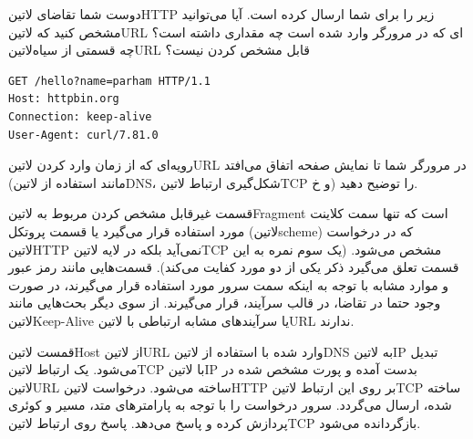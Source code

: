 
دوست شما تقاضای ‌لاتین{HTTP} زیر را برای شما ارسال کرده است.
آیا می‌توانید مشخص کنید که ‌لاتین{URL} ای که در مرورگر وارد شده است چه مقداری داشته است؟
چه قسمتی از ‌سیاه{‌لاتین{URL}} قابل مشخص کردن نیست؟

\begin{latin}
\begin{verbatim}
GET /hello?name=parham HTTP/1.1
Host: httpbin.org
Connection: keep-alive
User-Agent: curl/7.81.0
\end{verbatim}
\end{latin}

رویه‌ای که از زمان وارد کردن ‌لاتین{URL} در مرورگر شما تا نمایش صفحه اتفاق می‌افتد (مانند استفاده از ‌لاتین{DNS}، شکل‌گیری ارتباط ‌لاتین{TCP} و ‌خ) را توضیح دهید.



قسمت غیرقابل مشخص کردن مربوط به ‌لاتین{Fragment} است که تنها سمت کلاینت مورد استفاده قرار می‌گیرد
یا قسمت پروتکل (‌لاتین{scheme}) که در درخواست ‌لاتین{HTTP} نمی‌آید بلکه در لایه ‌لاتین{TCP} مشخص می‌شود.
(یک سوم نمره به این قسمت تعلق می‌گیرد ذکر یکی از دو مورد کفایت می‌کند).
قسمت‌هایی مانند رمز عبور و موارد مشابه با توجه به اینکه سمت سرور مورد استفاده قرار می‌گیرند، در صورت وجود حتما در تقاضا،
در قالب سرآیند، قرار می‌گیرند.
از سوی دیگر بحث‌هایی مانند ‌لاتین{Keep-Alive} یا سرآیندهای مشابه ارتباطی با ‌لاتین{URL} ندارند.

 قمست ‌لاتین{Host} از ‌لاتین{URL} وارد شده با استفاده از ‌لاتین{DNS} به ‌لاتین{IP} تبدیل می‌شود.
 یک ارتباط ‌لاتین{TCP} با ‌لاتین{IP} بدست آمده و پورت مشخص شده در ‌لاتین{URL} ساخته می‌شود.
 درخواست ‌لاتین{HTTP} بر روی این ارتباط ‌لاتین{TCP} ساخته شده، ارسال می‌گردد.
 سرور درخواست را با توجه به پارامترهای متد، مسیر و کوئری پردازش کرده و پاسخ می‌دهد.
 پاسخ روی ارتباط ‌لاتین{TCP} بازگردانده می‌شود.

